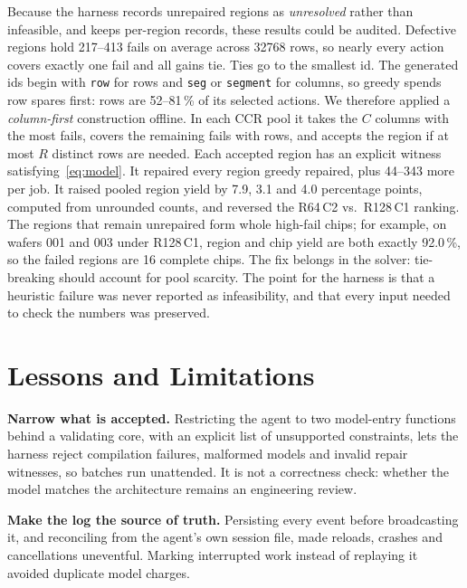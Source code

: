 \documentclass[conference]{IEEEtran}
\newcommand{\code}[1]{\texttt{\small #1}}
\begin{document}
Because the harness records unrepaired regions as \emph{unresolved} rather
than infeasible, and keeps per-region records, these results could be
audited. Defective regions hold 217--413 fails on average across 32768 rows,
so nearly every action covers exactly one fail and all gains tie. Ties go to
the smallest id. The generated ids begin with \code{row} for rows and
\code{seg} or \code{segment} for columns, so greedy spends row spares first:
rows are 52--81\,\% of its selected actions. We therefore applied a
\emph{column-first} construction offline. In each CCR pool it takes the $C$
columns with the most fails, covers the remaining fails with rows, and
accepts the region if at most $R$ distinct rows are needed. Each accepted
region has an explicit witness satisfying~\eqref{eq:model}. It repaired every
region greedy repaired, plus 44--343 more per job. It raised pooled region
yield by 7.9, 3.1 and 4.0 percentage points, computed from unrounded counts,
and reversed the R64\,C2 vs.\ R128\,C1
ranking. The regions that remain unrepaired form whole high-fail chips; for
example, on wafers 001 and 003 under R128\,C1, region and chip yield are both
exactly 92.0\,\%, so the failed regions are 16 complete chips. The fix
belongs in the solver: tie-breaking should account for pool scarcity. The
point for the harness is that a heuristic failure was never reported as
infeasibility, and that every input needed to check the numbers was
preserved.

\section{Lessons and Limitations}
\label{sec:lessons}

\textbf{Narrow what is accepted.} Restricting the agent to two model-entry
functions behind a validating core, with an explicit list of unsupported
constraints, lets the harness reject compilation failures, malformed models
and invalid repair witnesses, so batches run unattended. It is not a
correctness check: whether the model matches the architecture remains an
engineering review.

\textbf{Make the log the source of truth.} Persisting every event before
broadcasting it, and reconciling from the agent's own session file, made
reloads, crashes and cancellations uneventful. Marking interrupted work
instead of replaying it avoided duplicate model charges.
\end{document}

